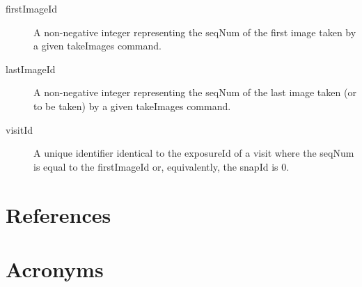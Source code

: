 \documentclass[SE,authoryear,toc]{lsstdoc}
\begin{document}
\begin{description}
  \item[firstImageId]
    A non-negative integer representing the seqNum of the first image taken by
    a given takeImages command.

  \item[lastImageId]
    A non-negative integer representing the seqNum of the last image taken (or
    to be taken) by a given takeImages command.

  \item[visitId]
    A unique identifier identical to the exposureId of a visit where the seqNum
    is equal to the firstImageId or, equivalently, the snapId is 0.
\end{description}





\appendix
\section{References} \label{sec:bib}
\renewcommand{\refname}{} %


\section{Acronyms} \label{sec:acronyms}

\end{document}
